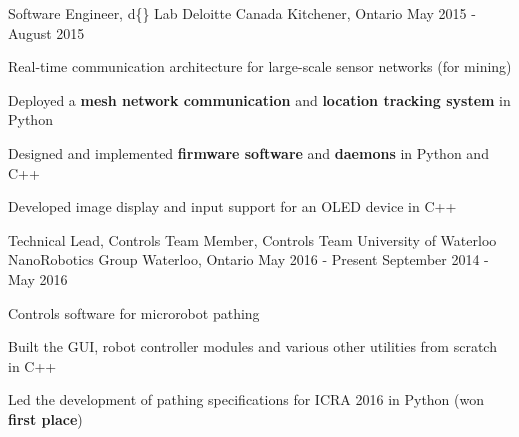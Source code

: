 \begin{cventries}

\cventry
{Software Engineer, d\{\} Lab}
{Deloitte Canada} %
{Kitchener, Ontario} %
{May 2015 - August 2015} %
{
Real-time communication architecture for large-scale sensor networks (for mining)
\begin{cvitems}
\item[]
\item {Deployed a \textbf{mesh network communication} and \textbf{location tracking system} in Python}
\item {Designed and implemented \textbf{firmware software} and \textbf{daemons} in Python and C++}
\item {Developed image display and input support for an OLED device in C++}
\end{cvitems}
}


\cventry
{Technical Lead, Controls Team \newline {\vspace{-.75mm}}
Member, Controls Team}
{University of Waterloo NanoRobotics Group}
{Waterloo, Ontario}
{May 2016 - Present \newline {\vspace{-1mm}}
September 2014 - May 2016} %
{ %
Controls software for microrobot pathing
\begin{cvitems}
\item[]
\item {Built the GUI, robot controller modules and various other utilities from scratch in C++}
\item {Led the development of pathing specifications for ICRA 2016 in Python (won \textbf{first place})}
\end{cvitems} 
} 

\end{cventries}
